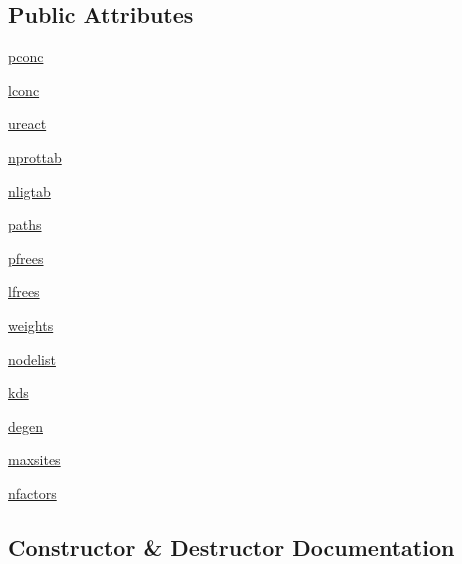 \subsection*{Public Attributes}
\begin{DoxyCompactItemize}
\item 
\hyperlink{class_uni_dec_1_1unidec__modules_1_1_uni_fit_1_1kdstruct_adcc73e871a63babb243bece480f9c49e}{pconc}
\item 
\hyperlink{class_uni_dec_1_1unidec__modules_1_1_uni_fit_1_1kdstruct_a20f38bf542ade5742c64581a88587827}{lconc}
\item 
\hyperlink{class_uni_dec_1_1unidec__modules_1_1_uni_fit_1_1kdstruct_a11de49d8eb9c9aa23a720041aefc6d5e}{ureact}
\item 
\hyperlink{class_uni_dec_1_1unidec__modules_1_1_uni_fit_1_1kdstruct_a9d6d41d4bdcafe26e49353dc597ffe8b}{nprottab}
\item 
\hyperlink{class_uni_dec_1_1unidec__modules_1_1_uni_fit_1_1kdstruct_a4be24b7335beef5e1386f137e4580102}{nligtab}
\item 
\hyperlink{class_uni_dec_1_1unidec__modules_1_1_uni_fit_1_1kdstruct_acb92061356cb15c0acb390afe7f16fbf}{paths}
\item 
\hyperlink{class_uni_dec_1_1unidec__modules_1_1_uni_fit_1_1kdstruct_aee23fa344d3c68f79f2db3ae8f59be6f}{pfrees}
\item 
\hyperlink{class_uni_dec_1_1unidec__modules_1_1_uni_fit_1_1kdstruct_a749043653d297877b7c67a5ab76eeb3a}{lfrees}
\item 
\hyperlink{class_uni_dec_1_1unidec__modules_1_1_uni_fit_1_1kdstruct_a565d83d2bcf9999fce4a7c82edac5071}{weights}
\item 
\hyperlink{class_uni_dec_1_1unidec__modules_1_1_uni_fit_1_1kdstruct_a3cfb4623fb90233c1d7a54c58a5cb61c}{nodelist}
\item 
\hyperlink{class_uni_dec_1_1unidec__modules_1_1_uni_fit_1_1kdstruct_a84f87f3e2f172496829d3c6795d41d28}{kds}
\item 
\hyperlink{class_uni_dec_1_1unidec__modules_1_1_uni_fit_1_1kdstruct_a0407f0baa371307473be3457eaf8a436}{degen}
\item 
\hyperlink{class_uni_dec_1_1unidec__modules_1_1_uni_fit_1_1kdstruct_abf1c0400b6e40e6feb54df5161d7bdbd}{maxsites}
\item 
\hyperlink{class_uni_dec_1_1unidec__modules_1_1_uni_fit_1_1kdstruct_aa5d62cacca8be8720cd50bc955bf3221}{nfactors}
\end{DoxyCompactItemize}


\subsection{Constructor \& Destructor Documentation}
\hypertarget{class_uni_dec_1_1unidec__modules_1_1_uni_fit_1_1kdstruct_a38e774ba9925944fc95dd18b65517c63}{}
